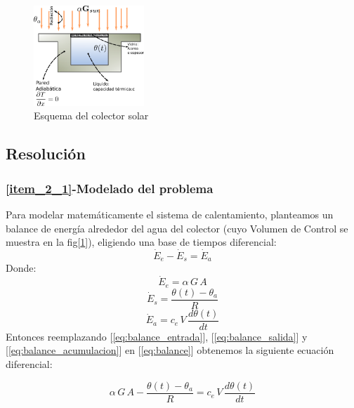 \begin{figure}[H]
   \centering
   \includegraphics[width=0.37\textwidth]{Images/colector_esquema.eps}
   \caption{Esquema del colector solar}\label{fig:colector_esquema}
\end{figure}
\subsection{Resolución}
\subsubsection{\ref{item_2_1}-Modelado del problema}
Para modelar matemáticamente el sistema de calentamiento, planteamos un balance de energía alrededor
del agua del colector (cuyo Volumen de Control se muestra en la fig[\ref{fig:colector_esquema}]),
eligiendo una base de tiempos diferencial:
\begin{equation}
   \dot{E}_{e} - \dot{E}_{s}=\dot{E}_{a}\label{eq:balance}
\end{equation}
Donde:
\begin{equation}
   \dot{E}_{e} = \alpha\,G\,A\label{eq:balance_entrada}
\end{equation}
\begin{equation}
   \dot{E}_{s} = \dfrac{\theta(t) - \theta_{a}}{R}\label{eq:balance_salida}
\end{equation}
\begin{equation}
   \dot{E}_{a} = c_{e}\,V\,\dfrac{d\theta(t)}{dt}\label{eq:balance_acumulacion}
\end{equation}
Entonces reemplazando [\ref{eq:balance_entrada}], [\ref{eq:balance_salida}] y
[\ref{eq:balance_acumulacion}] en [\ref{eq:balance}] obtenemos la siguiente ecuación diferencial:

\begin{equation}
   \alpha\,G\,A - \dfrac{\theta(t) - \theta_{a}}{R} = c_{e}\,V\,\dfrac{d\theta(t)}{dt}\label{eq:balance_completo}
\end{equation}


